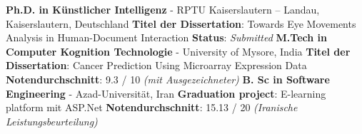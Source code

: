 %
%
%

\vspace{1em}

\begin{scholarship}
	{
		\textbf{Ph.D. in Künstlicher Intelligenz} - RPTU Kaiserslautern -- Landau, Kaiserslautern, Deutschland \newline
		\textbf{Titel der Dissertation}: Towards Eye Movements Analysis in Human-Document Interaction \newline
		\textbf{Status}: \textit{Submitted} \newline
	}
	{
		\textbf{M.Tech in Computer Kognition Technologie} - University of Mysore, India \newline
		\textbf{Titel der Dissertation}: Cancer Prediction Using Microarray Expression Data \newline
		\textbf{Notendurchschnitt}: 9.3 / 10 \textit{(mit Ausgezeichneter) }\newline
	}
	{
		\textbf{B. Sc in Software Engineering} - Azad-Universität, Iran \newline
		\textbf{Graduation project}: E-learning platform mit ASP.Net \newline
		\textbf{Notendurchschnitt}: 15.13 / 20 \textit{(Iranische Leistungsbeurteilung)}  \newline
	}
\end{scholarship}